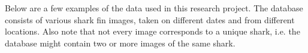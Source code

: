 \documentclass[a4paper,10pt]{article}
\begin{document}
\newpage
Below are a few examples of the data used in this research project.  
The database consists of various shark fin images, taken on different dates and
from different locations.
Also note that not every image corresponds to a unique shark, i.e. the database
might contain two or more images of the same shark.

\begin{figure}[H]
\centering
\mbox{ \quad
{} \quad
{}}
\end{figure}
\end{document}
